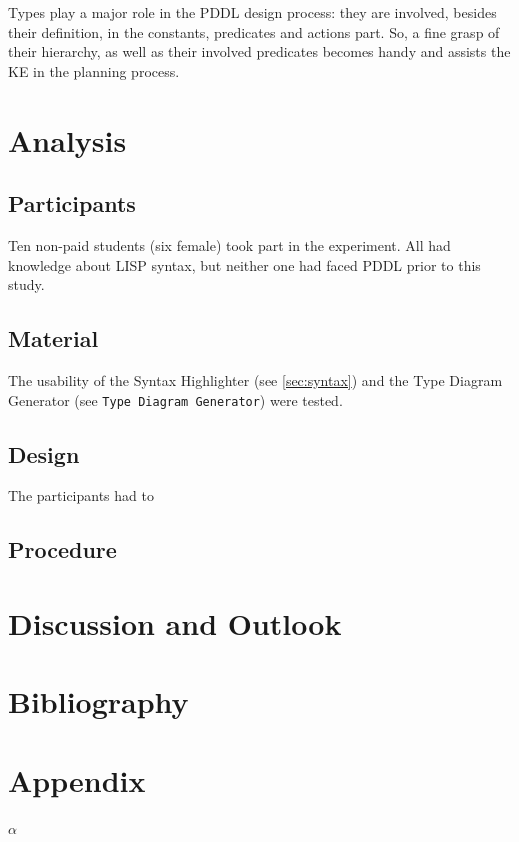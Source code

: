 \documentclass[11pt]{report}
\begin{document}
Types play a major role in the PDDL design process: they are involved,
besides their definition, in the constants, predicates and actions
part. So, a fine grasp of their hierarchy, as well as their involved
predicates becomes handy and assists the KE in the planning process. 

\chapter{Analysis}
\label{sec-5}
\section{Participants}
\label{sec-5-1}
Ten non-paid students (six female) took part in the experiment. All
had knowledge about LISP syntax, but neither one had faced PDDL prior
to this study. 
\section{Material}
\label{sec-5-2}
The usability of the Syntax Highlighter (see \ref{sec:syntax}) and the Type
Diagram Generator (see \texttt{Type Diagram Generator}) were
tested.
\section{Design}
\label{sec-5-3}

The participants had to 

\section{Procedure}
\label{sec-5-4}
\chapter{Discussion and Outlook}
\label{sec-6}
\chapter{Bibliography}
\label{sec-7}
\printbibliography

\chapter{Appendix}
\label{sec-8}
\(\alpha\)
\end{document}
